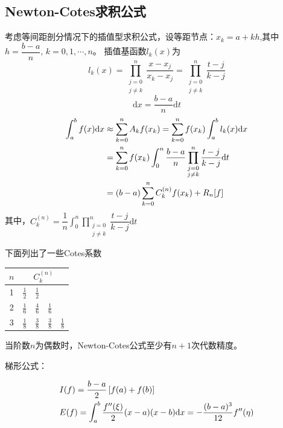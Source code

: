 \subsection{Newton-Cotes求积公式}
\begin{definition}
    考虑等间距剖分情况下的插值型求积公式，设等距节点：$x_k = a+kh$,其中$h = \dfrac{b-a}{n},\,k = 0,1,\cdots, n$。
    插值基函数$l_{k}(x)$为
    \[
        l_{k}(x) = \prod\limits_{\substack{j=0\\ j\neq k}}^{n}\dfrac{x-x_j}{x_k-x_j} = \prod\limits_{\substack{j=0\\ j\neq k}}^{n}\dfrac{t-j}{k-j}
    \]
    \[
        \mathrm{d}x = \dfrac{b-a}{n}\mathrm{d}t
    \]
    \[
        \begin{aligned}
            \int_a^bf(x)\mathrm{d}x  &\approx \sum_{k= 0}^{n}A_{k}f(x_k)  = \sum_{k= 0}^{n}f(x_k)\int_{a}^{b}l_{k}(x)\mathrm{d} x \\
            & = \sum_{k= 0}^{n}f(x_k)\int_{0}^{n}\frac{b-a}{n}\prod\limits_{\substack{j=0\\ j\neq k}}^{n}\dfrac{t-j}{k-j}\mathrm{d} t \\
            &= (b-a)\sum\limits_{k = 0}^nC_{k}^{(n)}f(x_k)+R_n[f]
        \end{aligned}
    \]
    其中，$C_k^{(n)}=\dfrac{1}{n}\int_{0}^{n}\prod\limits_{\substack{j=0\\ j\neq k}}^{n}\dfrac{t-j}{k-j}\mathrm{d}t$
\end{definition}
下面列出了一些Cotes系数
\begin{table}[htbp]
    \centering
        \begin{tabular}{c|cccc}
            \hline
            $n$ & \multicolumn{4}{c}{$C_{k}^{(n)}$} \bigstrut\\
            \hline
            1   & $\frac{1}{2}$ & $\frac{1}{2}$ &     &  \bigstrut[t]\\
            2   & $\frac{1}{6}$ & $\frac{4}{6}$ & $\frac{1}{6}$ &  \\
            3   & $\frac{1}{8}$ & $\frac{3}{8}$ & $\frac{3}{8}$ & $\frac{1}{8}$ \bigstrut[b]\\
            \hline
        \end{tabular}%
\end{table}%
\begin{theorem}
    当阶数$n$为偶数时，Newton-Cotes公式至少有$n+1$次代数精度。
\end{theorem}
\begin{note}
    梯形公式：

    \[
        \begin{aligned}
            &I(f) = \frac{b-a}{2}\left[ f(a)+f(b) \right] \\
            &E(f) = \int_{a}^{b}\dfrac{f''(\xi)}{2}(x-a)(x-b)\mathrm{d} x = -\frac{(b-a)^3}{12}f''(\eta)
        \end{aligned} 
    \]
\end{note}
